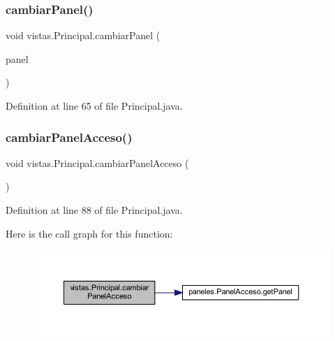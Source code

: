 \subsubsection{\texorpdfstring{cambiar\+Panel()}{cambiarPanel()}}
{\footnotesize\ttfamily void vistas.\+Principal.\+cambiar\+Panel (\begin{DoxyParamCaption}\item[{J\+Panel}]{panel }\end{DoxyParamCaption})}



Definition at line 65 of file Principal.\+java.

\mbox{\label{classvistas_1_1_principal_a0823d729a42c384bf4afd30b60a3e468}} 
\subsubsection{\texorpdfstring{cambiar\+Panel\+Acceso()}{cambiarPanelAcceso()}}
{\footnotesize\ttfamily void vistas.\+Principal.\+cambiar\+Panel\+Acceso (\begin{DoxyParamCaption}{ }\end{DoxyParamCaption})}



Definition at line 88 of file Principal.\+java.

Here is the call graph for this function\+:
\nopagebreak
\begin{figure}[H]
\begin{center}
\leavevmode
\includegraphics[width=350pt]{classvistas_1_1_principal_a0823d729a42c384bf4afd30b60a3e468_cgraph}
\end{center}
\end{figure}
\mbox{\label{classvistas_1_1_principal_aa6783bab03cc60f1bf401d4c16293318}} 
